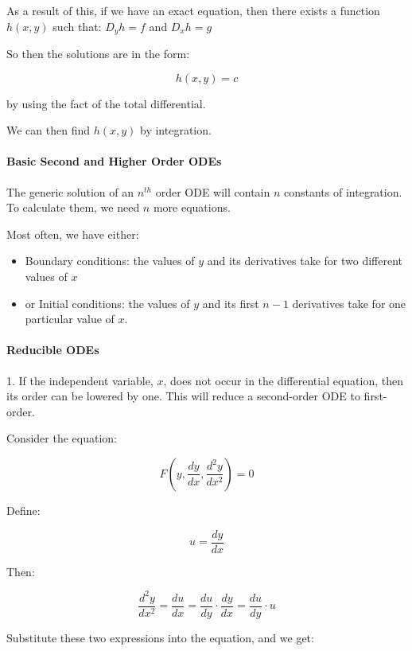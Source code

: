 As a result of this, if we have an exact equation, then there exists a function $h(x, y)$ such that:
$D_y h = f$ and $D_x h = g$



So then the solutions are in the form:

$$h(x, y) = c$$

by using the fact of the total differential.

We can then find $h(x, y)$ by integration.



\paragraph{Basic Second and Higher Order ODEs}



The generic solution of an $n^{th}$ order ODE will contain $n$ constants of integration. To calculate them, we need $n$ more equations.

Most often, we have either:

\begin{itemize}
    \item Boundary conditions: the values of $y$ and its derivatives take for two different values of $x$
    \item or Initial conditions: the values of $y$ and its first $n-1$ derivatives take for one particular value of $x$.
\end{itemize}

\paragraph{Reducible ODEs}



1.  If the independent variable, $x$, does not occur in the differential equation, then its order can be lowered by one. This will reduce a second-order ODE to first-order.



Consider the equation:

$$F\left(y,\frac{dy}{dx},\frac{d^2y}{dx^2}\right) = 0$$

Define:

$$u = \frac{dy}{dx}$$

Then:

$$\frac{d^2y}{dx^2} = \frac{du}{dx} = \frac{du}{dy} \cdot \frac{dy}{dx} = \frac{du}{dy} \cdot u$$

Substitute these two expressions into the equation, and we get:


